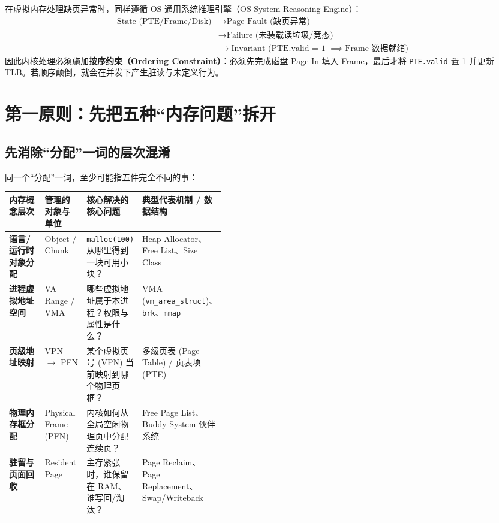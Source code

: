 \documentclass[11pt,a4paper]{ctexart}
\newcommand{\kw}[1]{\textbf{#1}}
\newcommand{\code}[1]{\texttt{#1}}
\begin{document}
\begin{eng}
在虚拟内存处理缺页异常时，同样遵循 OS 通用系统推理引擎（OS System Reasoning Engine）：
\[
\begin{aligned}
\text{State (PTE/Frame/Disk)} &\to \text{Page Fault (缺页异常)} \\
&\to \text{Failure (未装载读垃圾/竞态)} \\
&\to \text{Invariant (PTE.valid = 1 } \implies \text{Frame 数据就绪)}
\end{aligned}
\]
因此内核处理必须施加\kw{按序约束（Ordering Constraint）}：必须先完成磁盘 Page-In 填入 Frame，最后才将 \texttt{PTE.valid} 置 1 并更新 TLB。若顺序颠倒，就会在并发下产生脏读与未定义行为。
\end{eng}

\tableofcontents
\newpage

\section{第一原则：先把五种“内存问题”拆开}

\subsection{先消除“分配”一词的层次混淆}
同一个“分配”一词，至少可能指五件完全不同的事：

\begin{center}

\begingroup
\small
\renewcommand{\arraystretch}{1.25}
\setlength{\tabcolsep}{6pt}
\begin{tabularx}{\linewidth}{>{\bfseries}p{0.22\linewidth} p{0.2\linewidth} X X}
\toprule
内存概念层次 & 管理的对象与单位 & 核心解决的核心问题 & 典型代表机制 / 数据结构\\
\midrule
语言/运行时对象分配 & Object / Chunk & \code{malloc(100)} 从哪里得到一块可用小块？ & Heap Allocator、Free List、Size Class\\
进程虚拟地址空间 & VA Range / VMA & 哪些虚拟地址属于本进程？权限与属性是什么？ & VMA (\code{vm\_area\_struct})、\code{brk}、\code{mmap}\\
页级地址映射 & VPN $\rightarrow$ PFN & 某个虚拟页号 (VPN) 当前映射到哪个物理页框？ & 多级页表 (Page Table) / 页表项 (PTE)\\
物理内存框分配 & Physical Frame (PFN) & 内核如何从全局空闲物理页中分配连续页？ & Free Page List、Buddy System 伙伴系统\\
驻留与页面回收 & Resident Page & 主存紧张时，谁保留在 RAM、谁写回/淘汰？ & Page Reclaim、Page Replacement、Swap/Writeback\\
\bottomrule
\end{tabularx}
\endgroup
\end{center}
\end{document}
